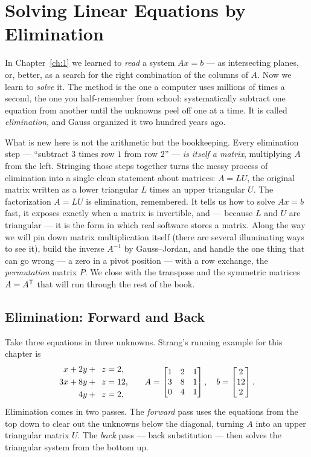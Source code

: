 \chapter{Solving Linear Equations by Elimination}
\label{ch:2}

In Chapter~\ref{ch:1} we learned to \emph{read} a system $Ax=b$ --- as intersecting planes, or, better, as a search for the right combination of the columns of $A$. Now we learn to \emph{solve} it. The method is the one a computer uses millions of times a second, the one you half-remember from school: systematically subtract one equation from another until the unknowns peel off one at a time. It is called \emph{elimination}, and Gauss organized it two hundred years ago.

What is new here is not the arithmetic but the bookkeeping. Every elimination step --- ``subtract $3$ times row $1$ from row $2$'' --- \emph{is itself a matrix}, multiplying $A$ from the left. Stringing those steps together turns the messy process of elimination into a single clean statement about matrices: $A = LU$, the original matrix written as a lower triangular $L$ times an upper triangular $U$. The factorization $A=LU$ is elimination, remembered. It tells us how to solve $Ax=b$ fast, it exposes exactly when a matrix is invertible, and --- because $L$ and $U$ are triangular --- it is the form in which real software stores a matrix. Along the way we will pin down matrix multiplication itself (there are several illuminating ways to see it), build the inverse $A^{-1}$ by Gauss--Jordan, and handle the one thing that can go wrong --- a zero in a pivot position --- with a row exchange, the \emph{permutation} matrix $P$. We close with the transpose and the symmetric matrices $A=A^{\mathsf T}$ that will run through the rest of the book.

\section{Elimination: Forward and Back}

Take three equations in three unknowns. Strang's running example for this chapter is
\begin{equation}\label{eq:ch2-system}
\begin{aligned}
   x + 2y + \phantom{1}z &= 2,\\
  3x + 8y + \phantom{1}z &= 12,\\
  \phantom{3x +\ } 4y + \phantom{1}z &= 2,
\end{aligned}
\qquad
A=\begin{bmatrix} 1 & 2 & 1\\ 3 & 8 & 1\\ 0 & 4 & 1\end{bmatrix},
\quad
b=\begin{bmatrix} 2\\ 12\\ 2\end{bmatrix}.
\end{equation}
Elimination comes in two passes. The \emph{forward} pass uses the equations from the top down to clear out the unknowns below the diagonal, turning $A$ into an upper triangular matrix $U$. The \emph{back} pass --- back substitution --- then solves the triangular system from the bottom up.

